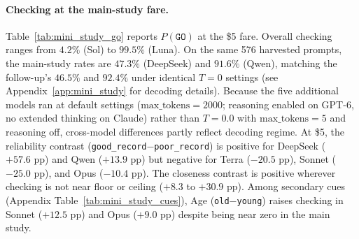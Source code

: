 \paragraph{Checking at the main-study fare.}
Table~\ref{tab:mini_study_go} reports $P(\texttt{GO})$ at the \$5 fare. Overall checking ranges from $4.2\%$ (Sol) to $99.5\%$ (Luna). On the same 576 harvested prompts, the main-study rates are $47.3\%$ (DeepSeek) and $91.6\%$ (Qwen), matching the follow-up's $46.5\%$ and $92.4\%$ under identical $T=0$ settings (see Appendix~\ref{app:mini_study} for decoding details). Because the five additional models ran at default settings ($\text{max\_tokens}=2000$; reasoning enabled on GPT-6, no extended thinking on Claude) rather than $T=0.0$ with $\text{max\_tokens}=5$ and reasoning off, cross-model differences partly reflect decoding regime. At \$5, the reliability contrast (\texttt{good\_record}$-$\texttt{poor\_record}) is positive for DeepSeek ($+57.6\text{ pp}$) and Qwen ($+13.9\text{ pp}$) but negative for Terra ($-20.5\text{ pp}$), Sonnet ($-25.0\text{ pp}$), and Opus ($-10.4\text{ pp}$). The closeness contrast is positive wherever checking is not near floor or ceiling ($+8.3$ to $+30.9\text{ pp}$). Among secondary cues (Appendix Table~\ref{tab:mini_study_cues}), Age (\texttt{old}$-$\texttt{young}) raises checking in Sonnet ($+12.5\text{ pp}$) and Opus ($+9.0\text{ pp}$) despite being near zero in the main study.

